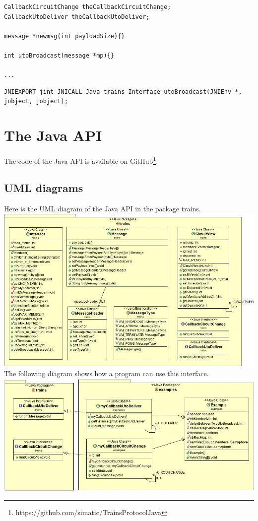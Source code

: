 \documentclass[a4paper,10pt]{report}
\begin{document}
\begin{itemize}
\begin{lstlisting}
CallbackCircuitChange theCallbackCircuitChange;
CallbackUtoDeliver theCallbackUtoDeliver;

message *newmsg(int payloadSize){}

int utoBroadcast(message *mp){}

...

\end{lstlisting}

\lstset{language=C}
\lstset{commentstyle=\textit} 
\begin{lstlisting}
JNIEXPORT jint JNICALL Java_trains_Interface_utoBroadcast(JNIEnv *, jobject, jobject);
\end{lstlisting}
\end{itemize}

\section{The Java API}

The code of the Java API is available on GitHub\footnote{https://github.com/simatic/TrainsProtocolJava}.

\subsection{UML diagrams}

Here is the UML diagram of the Java API in the package trains.\\

\includegraphics[scale=0.55]{img/trainsInterface.jpg}\\

The following diagram shows how a program can use this interface.\\

\includegraphics[scale=0.55]{img/example.jpg}\\
\end{document}
